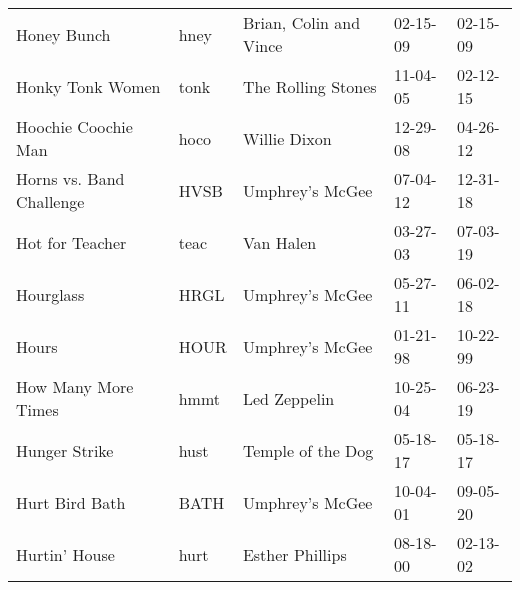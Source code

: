 \begin{longtable}{p{}p{}p{}p{}p{}}
                                                             Honey Bunch &          hney &                                   Brian, Colin and Vince &              02-15-09 &             02-15-09 \\
                                                        Honky Tonk Women &          tonk &                                       The Rolling Stones &              11-04-05 &             02-12-15 \\
                                                     Hoochie Coochie Man &          hoco &                                             Willie Dixon &              12-29-08 &             04-26-12 \\
                                                Horns vs. Band Challenge &          HVSB &                                          Umphrey's McGee &              07-04-12 &             12-31-18 \\
                                                         Hot for Teacher &          teac &                                                Van Halen &              03-27-03 &             07-03-19 \\
                                                               Hourglass &          HRGL &                                          Umphrey's McGee &              05-27-11 &             06-02-18 \\
                                                                   Hours &          HOUR &                                          Umphrey's McGee &              01-21-98 &             10-22-99 \\
                                                     How Many More Times &          hmmt &                                             Led Zeppelin &              10-25-04 &             06-23-19 \\
                                                           Hunger Strike &          hust &                                        Temple of the Dog &              05-18-17 &             05-18-17 \\
                                                          Hurt Bird Bath &          BATH &                                          Umphrey's McGee &              10-04-01 &             09-05-20 \\
                                                           Hurtin' House &          hurt &                                          Esther Phillips &              08-18-00 &             02-13-02 \\

\end{longtable}
